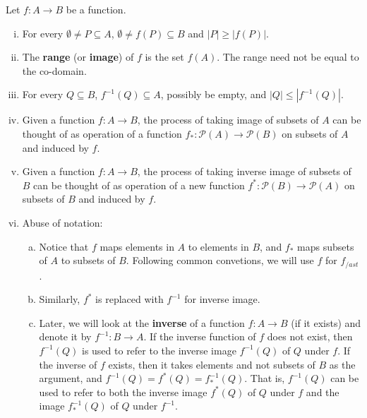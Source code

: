 \documentclass[a4paper,english,12pt]{article}
\begin{document}
\begin{rem} Let $f: A \to B$ be a function.
\begin{enumerate}[i)]
\item For every $\emptyset \neq P\subseteq A$, $\emptyset \neq f(P)\subseteq B$ and $|P|\geqslant |f(P)|$. 
\item The \textbf{range} (or \textbf{image}) of $f$ is the set $f(A)$. The range need not be equal to the co-domain.
\item For every $Q\subseteq B$, $f^{-1}(Q)\subseteq A$, possibly be empty, and $|Q|\leqslant |f^{-1}(Q)|$. 
\item Given a function $f:A \to B$, the process of taking image of subsets of $A$ can be thought of as operation of a function $f_{\ast}:\mathcal{P}(A)\to \mathcal{P}(B)$ on subsets of $A$ and induced by $f$.
\item Given a function $f: A \to B$, the process of taking inverse image of subsets of $B$ can be thought of as operation of a new function $f^{\ast}:\mathcal{P}(B) \to \mathcal{P}(A)$ on subsets of $B$ and induced by $f$.
\item Abuse of notation: 
\begin{enumerate}[a)]
\item Notice that $f$ maps elements in $A$ to elements in $B$, and $f_{\ast}$ maps subsets of $A$ to subsets of $B$. Following common convetions, we will use $f$ for $f_{/ast}$. 
\item Similarly, $f^{\ast}$ is replaced with $f^{-1}$ for inverse image. 
\item Later, we will look at the \textbf{inverse} of a function $f:A \to B$ (if it exists) and denote it by $f^{-1} : B \to A$. If the inverse function of $f$ does not exist, then $f^{-1}(Q)$ is used to refer to the inverse image $f^{-1}(Q)$ of $Q$ under $f$. If the inverse of $f$ exists, then it takes elements and not subsets of $B$ as the argument, and $f^{-1}(Q)=f^{\ast}(Q)=f^{-1}_*(Q)$. That is, $f^{-1}(Q)$ can be used to refer to both the inverse image $f^{\ast}(Q)$ of $Q$ under $f$ and the image $f^{-1}_*(Q)$ of $Q$ under $f^{-1}$.
\end{enumerate}
\end{enumerate}
\end{rem}
\end{document}
